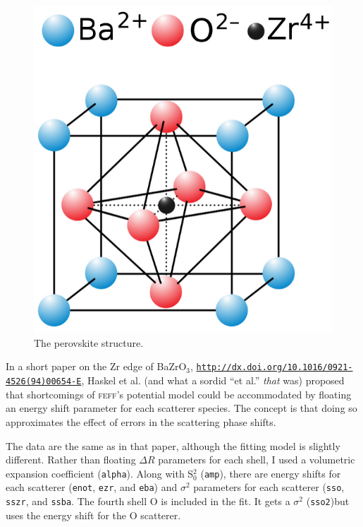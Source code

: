 \documentclass{article}
\begin{document}
\begin{figure}
  \includegraphics[width=\linewidth]{BaZrO3/perovskite.png}
  \caption{The perovskite structure.}
\end{figure}
In a short paper on the Zr edge of BaZrO$_3$,
\href{http://dx.doi.org/10.1016/0921-4526(94)00654-E}
{\texttt{http://dx.doi.org/10.1016/0921-4526(94)00654-E}}, Haskel et
al. (and what a sordid ``et al.'' \textit{that} was) proposed that
shortcomings of \textsc{feff}'s potential model could be accommodated
by floating an energy shift parameter for each scatterer species.  The
concept is that doing so approximates the effect of errors in the
scattering phase shifts.

The data are the same as in that paper, although the fitting model is
slightly different.  Rather than floating $\Delta R$ parameters for
each shell, I used a volumetric expansion coefficient
(\texttt{alpha}).  Along with S$_0^2$ (\texttt{amp}), there are energy
shifts for each scatterer (\texttt{enot}, \texttt{ezr}, and
\texttt{eba}) and $\sigma^2$ parameters for each scatterer
(\texttt{sso}, \texttt{sszr}, and \texttt{ssba}.  The fourth shell O
is included in the fit.  It gets a $\sigma^2$ (\texttt{sso2})but uses
the energy shift for the O scatterer.
\end{document}
